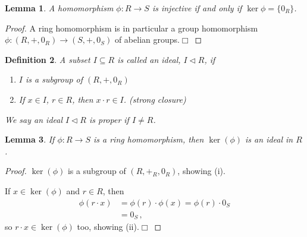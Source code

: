 \documentclass{article}
\theoremstyle{plain}\theoremheaderfont{\normalfont\itshape}\theorembodyfont{\rmfamily}\theoremseparator{.}\newtheorem*{rem}{Remark}\newtheorem*{ex}{Example}\newtheorem*{proof}{Proof}\newtheorem*{altp}{Alternative proof}\newtheorem*{nonex}{Non-Example}
\theoremstyle{plain}\theoremheaderfont{\normalfont\bfseries}\theorembodyfont{\rmfamily}\theoremseparator{.}\newtheorem{thm}{Theorem}[section]\newtheorem{lem}[thm]{Lemma}\newtheorem{prop}[thm]{Proposition}\newtheorem*{cor}{Corollary}\newtheorem{defn}[thm]{Definition}\newtheorem{clm}[thm]{Claim}\newtheorem{clminproof}{Claim}\newtheorem*{notn}{Notation}\newtheorem*{exer}{Exercise}\newtheorem*{lemnn}{Lemma}
\theoremstyle{break}\theoremheaderfont{\normalfont\itshape}\theorembodyfont{\rmfamily}\theoremseparator{.\medskip}\newtheorem*{proofskip}{Proof}\newtheorem*{exs}{Examples}\newtheorem*{rems}{Remarks}\newtheorem*{obs}{Observations}
\theoremstyle{break}\theoremheaderfont{\normalfont\bfseries}\theorembodyfont{\rmfamily}\theoremseparator{.\medskip}\newtheorem{lemskip}[thm]{Lemma}\newtheorem{defnskip}[thm]{Definition}\newtheorem{propskip}[thm]{Proposition}\newtheorem{thmskip}[thm]{Theorem}
\numberwithin{equation}{section}
\newcommand{\qed}{\hfill\ensuremath{\Box}}
\begin{document}
    \begin{lem}
        A homomorphism \(\phi: R \to S\) is injective if and only if \(\ker\phi=\{0_R\}\).
    \end{lem}
    \begin{proof}
        A ring homomorphism is in particular a group homomorphism \(\phi: (R, +, 0_R) \to (S, +, 0_S)\) of abelian groups.\qed
    \end{proof}
    \begin{defn}
        A subset \(I\subseteq R\) is called an \textit{ideal}, \(I\lhd R\), if
        \begin{enumerate}[topsep=0pt,label=(\roman*)]
            \item \(I\) is a subgroup of \((R,+,0_R)\)
            \item If \(x\in I\), \(r\in R\), then \(x\cdot r\in I\). (strong closure)
        \end{enumerate}

        We say an ideal \(I\lhd R\) is \textit{proper} if \(I\ne R\).
    \end{defn}
    \begin{lem}
        If \(\phi:R\to S\) is a ring homomorphism, then \(\ker(\phi)\) is an ideal in \(R\).
    \end{lem}
    \begin{proof}
        \(\ker(\phi)\) is a subgroup of \((R,+_R,0_R)\), showing (i).

        If \(x\in\ker(\phi)\) and \(r\in R\), then
        \begin{align*}
            \phi(r\cdot x)&=\phi(r)\cdot\phi(x)=\phi(r)\cdot 0_S\\
            &=0_S\,,
        \end{align*}
        so \(r\cdot x\in\ker(\phi)\) too, showing (ii).\qed
    \end{proof}
\end{document}
